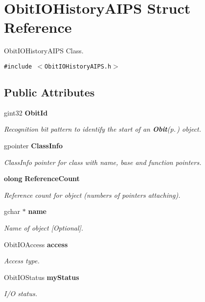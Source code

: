 \section{Obit\-IOHistory\-AIPS Struct Reference}
\label{structObitIOHistoryAIPS}
Obit\-IOHistory\-AIPS Class.  


{\tt \#include $<$Obit\-IOHistory\-AIPS.h$>$}

\subsection*{Public Attributes}
\begin{CompactItemize}
\item 
gint32 {\bf Obit\-Id}
\begin{CompactList}\small\item\em Recognition bit pattern to identify the start of an {\bf Obit}{\rm (p.\,\pageref{structObit})} object. \item\end{CompactList}\item 
gpointer {\bf Class\-Info}
\begin{CompactList}\small\item\em Class\-Info pointer for class with name, base and function pointers. \item\end{CompactList}\item 
{\bf olong} {\bf Reference\-Count}
\begin{CompactList}\small\item\em Reference count for object (numbers of pointers attaching). \item\end{CompactList}\item 
gchar $\ast$ {\bf name}
\begin{CompactList}\small\item\em Name of object [Optional]. \item\end{CompactList}\item 
Obit\-IOAccess {\bf access}
\begin{CompactList}\small\item\em Access type. \item\end{CompactList}\item 
Obit\-IOStatus {\bf my\-Status}
\begin{CompactList}\small\item\em I/O status. \item\end{CompactList}\item 

\end{CompactItemize}
